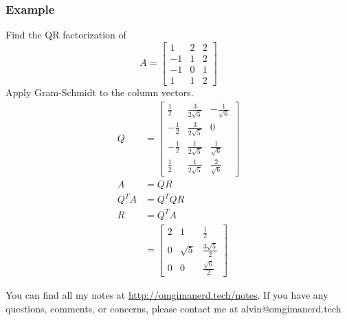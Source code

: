 \documentclass{math}
\begin{document}
\subsubsection*{Example}
Find the QR factorization of
\[ A = \begin{bmatrix}
  1 & 2 & 2 \\
  -1 & 1 & 2 \\
  -1 & 0 & 1 \\
  1 & 1 & 2
\end{bmatrix} \]
Apply Gram-Schmidt to the column vectors.
\begin{align*}
  Q &= \begin{bmatrix}
    \frac{1}{2} & \frac{3}{2\sqrt{5}} & -\frac{1}{\sqrt{6}} \\
    -\frac{1}{2} & \frac{3}{2\sqrt{5}} & 0 \\
    -\frac{1}{2} & \frac{1}{2\sqrt{5}} & \frac{1}{\sqrt{6}} \\
    \frac{1}{2} & \frac{1}{2\sqrt{5}} & \frac{2}{\sqrt{6}}
  \end{bmatrix} \\
  A &= QR \\
  Q^TA &= Q^TQR \\
  R &= Q^TA \\
  &= \begin{bmatrix}
    2 & 1 & \frac{1}{2} \\
    0 & \sqrt{5} & \frac{3\sqrt{5}}{2} \\
    0 & 0 & \frac{\sqrt{6}}{2}
  \end{bmatrix}
\end{align*}

\begin{center}
  You can find all my notes at \url{http://omgimanerd.tech/notes}. If you have
  any questions, comments, or concerns, please contact me at
  alvin@omgimanerd.tech
\end{center}
\end{document}
